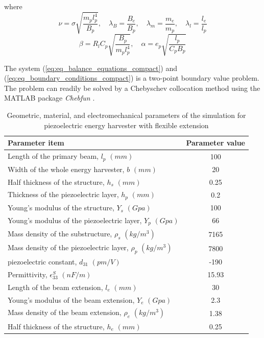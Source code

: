 \documentclass{elsarticle}
\begin{document}
where 
\begin{equation}
    \nu = \sigma \sqrt{ \frac{ m_p l_p^4 }{ B_p } },\quad \lambda_B = \frac{B_e}{B_p},\quad \lambda_m = \frac{m_e}{m_p},\quad \lambda_l = \frac{l_e}{l_p}
\end{equation}
\begin{equation}
    \beta = R_l C_p \sqrt{\frac{B_p}{m_p l_p^4}}, \quad \alpha = e_p \sqrt{\frac{l_p}{C_p B_p}}
\end{equation}

The system (\ref{eq:eq_balance_equations_compact}) and (\ref{eq:eq_boundary_conditions_compact}) is a two-point boundary value problem. The problem can readily be solved by a Chebyschev collocation method using the MATLAB package  \textit{Chebfun} \cite{driscoll2014chebfun}. 


\begin{table}[!htbp]
    \caption{Geometric, material, and electromechanical parameters of the simulation for piezoelectric energy harvester with flexible extension}
    \label{tab:parameter_value_extension}
    \centering
    \begin{tabular}{lc}
    \hline
    \hline
    \textbf{Parameter item} & \textbf{Parameter value} \\
    \hline
       Length of the primary beam, $l_p$ $(mm)$  & 100 \\
       Width of the whole energy harvester, $b$ $(mm)$  & 20 \\
       Half thickness of the structure, $h_s$ $(mm)$  & 0.25 \\
       Thickness of the piezoelectric layer, $h_p$ $(mm)$  & 0.2 \\
       Young's modulus of the structure, $Y_s$ $(Gpa)$  & 100 \\
       Young's modulus of the piezoelectric layer, $Y_p$ $(Gpa)$  & 66 \\
       Mass density of the substructure, $\rho_s$ $(kg/m^3)$  & 7165 \\
       Mass density of the piezoelectric layer, $\rho_p$ $(kg/m^3)$  & 7800 \\
       piezoelectric constant, $d_{31}$ $(pm/V)$  & -190 \\
       Permittivity, $\epsilon^S_{33}$ $(nF/m)$  & 15.93 \\
       Length of the beam extension, $l_e$ $(mm)$  & 30 \\
       Young's modulus of the beam extension, $Y_e$ $(Gpa)$  & 2.3 \\
       Mass density of the beam extension, $\rho_e$ $(kg/m^3)$  & 1.38 \\
       Half thickness of the structure, $h_e$ $(mm)$  & 0.25 \\
    \hline
    \hline
    \end{tabular}
\end{table}
\end{document}
